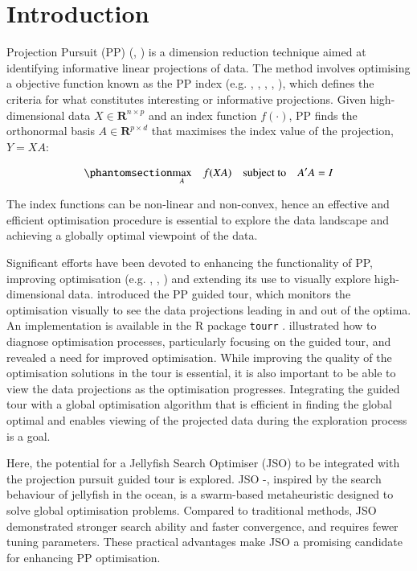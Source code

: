 \documentclass[
  number,
  preprint,
  3p]{elsarticle}
\begin{document}
\section{Introduction}\label{introduction}

Projection Pursuit (PP) (\citet{kr69}, \citet{FT74}) is a dimension
reduction technique aimed at identifying informative linear projections
of data. The method involves optimising a objective function known as
the PP index (e.g. \citet{hall1989polynomial},
\citet{cook1993projection}, \citet{lee2010projection},
\citet{Loperfido2018}, \citet{Loperfido2020}), which defines the
criteria for what constitutes interesting or informative projections.
Given high-dimensional data \(X \in \mathbf{R}^{n\times p}\) and an
index function \(f(\cdot)\), PP finds the orthonormal basis
\(A \in \mathbf{R}^{p \times d}\) that maximises the index value of the
projection, \(Y = XA\):

\begin{equation}\phantomsection\label{eq-optimization}{
\underset{A}{\max } \quad f(XA) \quad \text{subject to} \quad A'A = I
}\end{equation}

The index functions can be non-linear and non-convex, hence an effective
and efficient optimisation procedure is essential to explore the data
landscape and achieving a globally optimal viewpoint of the data.

Significant efforts have been devoted to enhancing the functionality of
PP, improving optimisation (e.g. \citet{posse1995},
\citet{marie-sainte2010}, \citet{grochowski2011}) and extending its use
to visually explore high-dimensional data. \citet{cook1995grand}
introduced the PP guided tour, which monitors the optimisation visually
to see the data projections leading in and out of the optima. An
implementation is available in the R \citep{R} package \texttt{tourr}
\citep{tourr}. \citet{RJ-2021-105} illustrated how to diagnose
optimisation processes, particularly focusing on the guided tour, and
revealed a need for improved optimisation. While improving the quality
of the optimisation solutions in the tour is essential, it is also
important to be able to view the data projections as the optimisation
progresses. Integrating the guided tour with a global optimisation
algorithm that is efficient in finding the global optimal and enables
viewing of the projected data during the exploration process is a goal.

Here, the potential for a Jellyfish Search Optimiser (JSO) to be
integrated with the projection pursuit guided tour is explored. JSO
\citep{chou_novel_2021} -\citep{rajwar_exhaustive_2023}, inspired by the
search behaviour of jellyfish in the ocean, is a swarm-based
metaheuristic designed to solve global optimisation problems. Compared
to traditional methods, JSO demonstrated stronger search ability and
faster convergence, and requires fewer tuning parameters. These
practical advantages make JSO a promising candidate for enhancing PP
optimisation.
\end{document}
